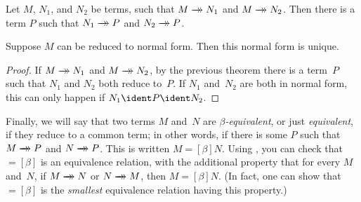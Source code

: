 \documentclass[../../../include/open-logic-section]{subfiles}
\begin{document}

\begin{thm}
Let $M$, $N_1$, and $N_2$ be terms, such that $M \red N_1$ and $M \red
N_2$. Then there is a term $P$ such that $N_1 \red P$ and $N_2 \red P$.
\end{thm}

\begin{cor}
Suppose $M$ can be reduced to normal form. Then this normal form is
unique.
\end{cor}

\begin{proof}
If $M \red N_1$ and $M \red N_2$, by the previous theorem there is a
term~$P$ such that $N_1$ and $N_2$ both reduce to~$P$. If $N_1$
and~$N_2$ are both in normal form, this can only happen if $N_1 \ident P \ident
N_2$.
\end{proof}

Finally, we will say that two terms $M$ and~$N$ are
\emph{$\beta$-equivalent}, or just \emph{equivalent}, if they reduce
to a common term; in other words, if there is some $P$ such that $M
\red P$ and $N \red P$. This is written $M \equal[\beta] N$. Using
, you can check that $\equal[\beta]$ is an
equivalence relation, with the additional property that for every $M$
and~$N$, if $M \red N$ or $N \red M$, then $M \equal[\beta] N$. (In fact, one
can show that $\equal[\beta]$ is the \emph{smallest} equivalence relation
having this property.)
\end{document}
